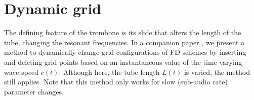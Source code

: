 \section{Dynamic grid}\label{sec:dynamicGrid}
The defining feature of the trombone is its slide that alters the length of the tube, changing the resonant frequencies. In a companion paper \cite{Willemsen2021}, we present a method to dynamically change grid configurations of FD schemes by inserting and deleting grid points based on an instantaneous value of the time-varying wave speed $c(t)$. Although here, the tube length $L(t)$ is varied, the method still applies. %
Note that this method only works for slow (sub-audio rate) parameter changes.

